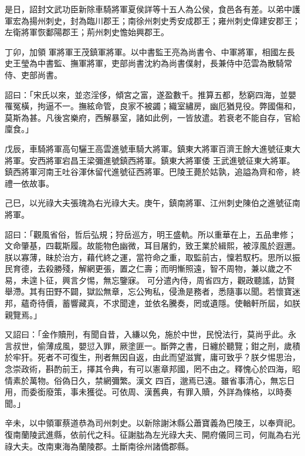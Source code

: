 \begin{pinyinscope}
 是日，詔封文武功臣新除車騎將軍夏侯詳等十五人為公侯，食邑各有差。以弟中護軍宏為揚州刺史，封為臨川郡王；南徐州刺史秀安成郡王；雍州刺史偉建安郡王；左衛將軍恢鄱陽郡王；荊州刺史憺始興郡王。



 丁卯，加領
 軍將軍王茂鎮軍將軍。以中書監王亮為尚書令、中軍將軍，相國左長史王瑩為中書監、撫軍將軍，吏部尚書沈約為尚書僕射，長兼侍中范雲為散騎常侍、吏部尚書。



 詔曰：「宋氏以來，並恣淫侈，傾宮之富，遂盈數千。推算五都，愁窮四海，並嬰罹冤橫，拘逼不一。撫絃命管，良家不被蠲；織室繡房，幽厄猶見役。弊國傷和，莫斯為甚。凡後宮樂府，西解暴室，諸如此例，一皆放遣。若衰老不能自存，官給廩食。」



 戊辰，車騎將軍高句驪王高雲進號車騎大將軍。鎮東大將軍百濟王餘大進號征東大將軍。安西將軍宕昌王梁彌進號鎮西將軍。鎮東大將軍倭
 王武進號征東大將軍。鎮西將軍河南王吐谷渾休留代進號征西將軍。巴陵王薨於姑孰，追謚為齊和帝，終禮一依故事。



 己巳，以光祿大夫張瑰為右光祿大夫。庚午，鎮南將軍、江州刺史陳伯之進號征南將軍。



 詔曰：「觀風省俗，哲后弘規；狩岳巡方，明王盛軌。所以重華在上，五品聿修；文命肇基，四載斯履。故能物色幽微，耳目屠釣，致王業於緝熙，被淳風於遐邇。朕以寡薄，昧於治方，藉代終之運，當符命之重，取監前古，懍若馭朽。思所以振民育德，去殺勝殘，解網更張，置之仁壽；而明慚照遠，智不周物，兼以歲之不易，未遑卜征，興言夕惕，無忘鑒寐。
 可分遣內侍，周省四方，觀政聽謠，訪賢舉滯。其有田野不闢，獄訟無章，忘公殉私，侵漁是務者，悉隨事以聞。若懷寶迷邦，蘊奇待價，蓄響藏真，不求聞達，並依名騰奏，罔或遺隱。使輶軒所屆，如朕親覽焉。」



 又詔曰：「金作贖刑，有聞自昔，入縑以免，施於中世，民悅法行，莫尚乎此。永言叔世，偷薄成風，嬰愆入罪，厥塗匪一。斷弊之書，日纏於聽覽；鉗之刑，歲積於牢犴。死者不可復生，刑者無因自返，由此而望滋實，庸可致乎？朕夕惕思治，念崇政術，斟酌前王，擇其令典，有可以憲章邦國，罔不由之。釋愧心於四海，昭情素於萬物。俗偽日久，禁網彌繁。漢文
 四百，邈焉已遠。雖省事清心，無忘日用，而委銜廢策，事未獲從。可依周、漢舊典，有罪入贖，外詳為條格，以時奏聞。」



 辛未，以中領軍蔡道恭為司州刺史。以新除謝沐縣公蕭寶義為巴陵王，以奉齊祀。復南蘭陵武進縣，依前代之科。征謝朏為左光祿大夫、開府儀同三司，何胤為右光祿大夫。改南東海為蘭陵郡。土斷南徐州諸僑郡縣。




\end{pinyinscope}
